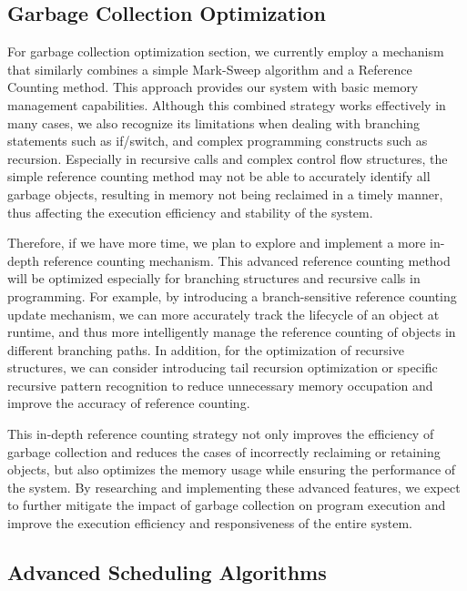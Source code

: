 \documentclass{l4proj}
\begin{document}
\subsection{Garbage Collection Optimization}

For garbage collection optimization section, we currently employ a mechanism that similarly combines a simple Mark-Sweep algorithm and a Reference Counting method. This approach provides our system with basic memory management capabilities. Although this combined strategy works effectively in many cases, we also recognize its limitations when dealing with branching statements such as if/switch, and complex programming constructs such as recursion. Especially in recursive calls and complex control flow structures, the simple reference counting method may not be able to accurately identify all garbage objects, resulting in memory not being reclaimed in a timely manner, thus affecting the execution efficiency and stability of the system.

Therefore, if we have more time, we plan to explore and implement a more in-depth reference counting mechanism. This advanced reference counting method will be optimized especially for branching structures and recursive calls in programming. For example, by introducing a branch-sensitive reference counting update mechanism, we can more accurately track the lifecycle of an object at runtime, and thus more intelligently manage the reference counting of objects in different branching paths. In addition, for the optimization of recursive structures, we can consider introducing tail recursion optimization or specific recursive pattern recognition to reduce unnecessary memory occupation and improve the accuracy of reference counting.

This in-depth reference counting strategy not only improves the efficiency of garbage collection and reduces the cases of incorrectly reclaiming or retaining objects, but also optimizes the memory usage while ensuring the performance of the system. By researching and implementing these advanced features, we expect to further mitigate the impact of garbage collection on program execution and improve the execution efficiency and responsiveness of the entire system.

\subsection{Advanced Scheduling Algorithms}
\end{document}
